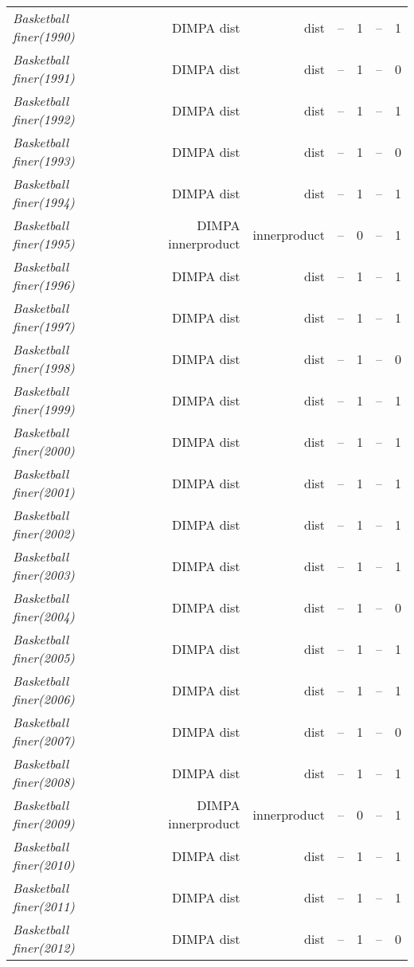 \documentclass[nohyperref]{article}
\theoremstyle{plain}
\theoremstyle{definition}
\theoremstyle{remark}
\begin{document}
\begin{table*}[!ht]
{\begin{tabular}{lrrrrrr}
			{\it Basketball finer(1990)} & DIMPA dist & dist & -- & 1 & -- & 1 \\
			{\it Basketball finer(1991)} & DIMPA dist & dist & -- & 1 & -- & 0 \\
			{\it Basketball finer(1992)} & DIMPA dist & dist & -- & 1 & -- & 1 \\
			{\it Basketball finer(1993)} & DIMPA dist & dist & -- & 1 & -- & 0 \\
			{\it Basketball finer(1994)} & DIMPA dist & dist & -- & 1 & -- & 1 \\
			{\it Basketball finer(1995)} & DIMPA innerproduct & innerproduct & -- & 0 & -- & 1 \\
			{\it Basketball finer(1996)} & DIMPA dist & dist & -- & 1 & -- & 1 \\
			{\it Basketball finer(1997)} & DIMPA dist & dist & -- & 1 & -- & 1 \\
			{\it Basketball finer(1998)} & DIMPA dist & dist & -- & 1 & -- & 0 \\
			{\it Basketball finer(1999)} & DIMPA dist & dist & -- & 1 & -- & 1 \\
			{\it Basketball finer(2000)} & DIMPA dist & dist & -- & 1 & -- & 1 \\
			{\it Basketball finer(2001)} & DIMPA dist & dist & -- & 1 & -- & 1 \\
			{\it Basketball finer(2002)} & DIMPA dist & dist & -- & 1 & -- & 1 \\
			{\it Basketball finer(2003)} & DIMPA dist & dist & -- & 1 & -- & 1 \\
			{\it Basketball finer(2004)} & DIMPA dist & dist & -- & 1 & -- & 0 \\
			{\it Basketball finer(2005)} & DIMPA dist & dist & -- & 1 & -- & 1 \\
			{\it Basketball finer(2006)} & DIMPA dist & dist & -- & 1 & -- & 1 \\
			{\it Basketball finer(2007)} & DIMPA dist & dist & -- & 1 & -- & 0 \\
			{\it Basketball finer(2008)} & DIMPA dist & dist & -- & 1 & -- & 1 \\
			{\it Basketball finer(2009)} & DIMPA innerproduct & innerproduct & -- & 0 & -- & 1 \\
			{\it Basketball finer(2010)} & DIMPA dist & dist & -- & 1 & -- & 1 \\
			{\it Basketball finer(2011)} & DIMPA dist & dist & -- & 1 & -- & 1 \\
			{\it Basketball finer(2012)} & DIMPA dist & dist & -- & 1 & -- & 0 \\

\end{tabular}}
\end{table*}
\end{document}
